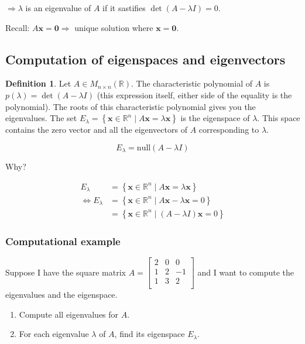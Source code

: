 \documentclass[12pt]{article}
\theoremstyle{plain}
\theoremstyle{remark}
\theoremstyle{definition}
\newtheorem{definition}{Definition}[section]
\begin{document}
\(\Rightarrow \lambda\) is an eigenvalue of \(A\) if it sastifies
\(\det(A - \lambda I) = 0\).

Recall: \(A\mathbf{x} = \mathbf{0} \Rightarrow\) unique solution
where \(\mathbf{x} = \mathbf{0}\).


\subsection{Computation of eigenspaces and
eigenvectors}

\begin{definition}
Let
\(A \in M_{n \times n}\left( \mathbb{R} \right)\). The characteristic
polynomial of \(A\) is \(p(\lambda) = \det(A - \lambda I)\) (this
expression itself, either side of the equality is the polynomial). The
roots of this characteristic polynomial gives you the eigenvalues. The
set
\(E_{\lambda} = \left\{ \mathbf{x} \in \mathbb{R}^{n}\mid A\mathbf{x} = \lambda\mathbf{x} \right\}\)
is the eigenspace of \(\lambda\). This space contains the zero vector
and all the eigenvectors of \(A\) corresponding to \(\lambda\).

\[E_{\lambda} = \text{null}\left( A - \lambda I \right)\]
\end{definition}

Why?

\begin{align*}
E_{\lambda} &= \left\{ \mathbf{x} \in \mathbb{R}^{n}\mid A\mathbf{x} = \lambda\mathbf{x} \right\} \\
\Leftrightarrow E_{\lambda} &= \left\{ \mathbf{x} \in \mathbb{R}^{n}\mid A\mathbf{x} - \lambda\mathbf{x} = 0 \right\} \\
&= \left\{ \mathbf{x} \in \mathbb{R}^{n}\mid\left( A - \lambda I \right)\mathbf{x} = 0 \right\}
\end{align*}



\subsubsection{Computational example}

Suppose I have the square matrix \(A = \begin{bmatrix}
2 & 0 & 0 \\
1 & 2 & - 1 \\
1 & 3 & 2 \\
\end{bmatrix}\) and I want to compute the eigenvalues and the
eigenspace.

\begin{enumerate}
\def\labelenumi{\arabic{enumi}.}
\item
  Compute all eigenvalues for \(A\).
\item
  For each eigenvalue \(\lambda\) of \(A\), find its eigenspace
  \(E_{\lambda}\).
\end{enumerate}
\end{document}
